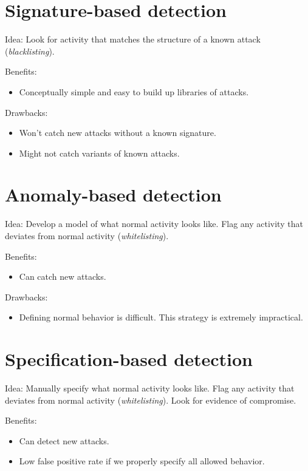 \section{Signature-based detection}
Idea: Look for activity that matches the structure of a known attack (\emph{blacklisting}).

\medskip
Benefits:
\begin{itemize}
    \item Conceptually simple and easy to build up libraries of attacks.
\end{itemize}

Drawbacks:
\begin{itemize}
    \item Won't catch new attacks without a known signature.
    \item Might not catch variants of known attacks.
\end{itemize}

\section{Anomaly-based detection}
Idea: Develop a model of what normal activity looks like. Flag any activity that deviates from normal activity (\emph{whitelisting}).

\medskip
Benefits:
\begin{itemize}
    \item Can catch new attacks.
\end{itemize}

Drawbacks:
\begin{itemize}
    \item Defining normal behavior is difficult. This strategy is extremely impractical. 
\end{itemize}

\section{Specification-based detection}
Idea: Manually specify what normal activity looks like. Flag any activity that deviates from normal activity (\emph{whitelisting}). Look for evidence of compromise.

\medskip
Benefits:
\begin{itemize}
    \item Can detect new attacks.
    \item Low false positive rate if we properly specify all allowed behavior.
\end{itemize}

